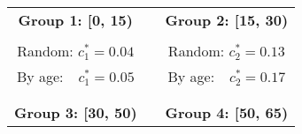 \documentclass[12pt]{article}
\begin{document}
\begin{figure}[htp]
\begin{center}%
\begin{tabular}
[c]{ccc}%
\textbf{Group 1: [0, 15)} &  & \textbf{Group 2: [15, 30)}\\%
{\includegraphics[
height=1.7772in,
width=2.3618in
]%
{figs/theory_cmp_random_oldfirst_dist_vacc_pct75_eff95_Wbeg10_12W_dcT_L1.png}%
}
&  &
{\includegraphics[
height=1.7772in,
width=2.3618in
]%
{figs/theory_cmp_random_oldfirst_dist_vacc_pct75_eff95_Wbeg10_12W_dcT_L2.png}%
}
\\
Random: $c_{1}^{\ast}=0.04$ &  & Random: $c_{2}^{\ast}=0.13$\\
By age: \ $\ c_{1}^{\ast}=0.05$ &  & By age: \ $\ c_{2}^{\ast}=0.17$\\
&  & \\
&  & \\
\textbf{Group 3: [30, 50)} &  & \textbf{Group 4: [50, 65)}\\%

\end{tabular}
\end{center}
\end{figure}
\end{document}
